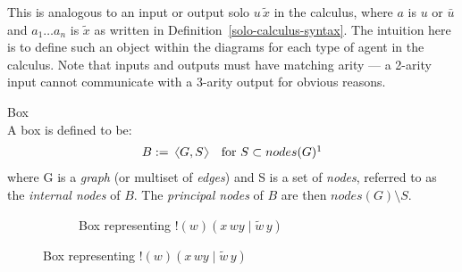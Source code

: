     This is analogous to an input or output solo $u \, \tilde{x}$ in the calculus, where $a$ is $u$ or $\bar{u}$ and $a_1 \ldots a_n$ is $\tilde{x}$ as written in Definition~\ref{solo-calculus-syntax}.
    The intuition here is to define such an object within the diagrams for each type of agent in the calculus.
    Note that inputs and outputs must have matching arity --- a 2-arity input cannot communicate with a 3-arity output for obvious reasons.

    \begin{definition}{Box\\}
        A box is defined to be:
        \begin{align*}
            B \defeq \, \langl G, S \rangl \quad \text{for } S \subset nodes(G)\footnotemark
        \end{align*}
        where G is a \textit{graph} (or multiset of \textit{edges}) and S is a set of \textit{nodes}, referred to as the \textit{internal nodes} of $B$.
        The \textit{principal nodes} of $B$ are then $nodes(G) \setminus S$.
    \end{definition}

    \begin{figure}[H]
        \centering
        \begin{subfigure}{0.4\linewidth}
            \centering
            \caption*{Box representing $!(w)(x \, w y \; | \; \tilde{w} \, y)$}
        \end{subfigure}\footnotemark
    \end{figure}

